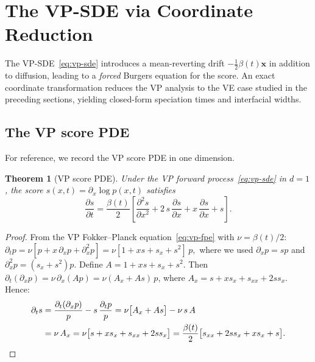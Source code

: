 \documentclass[11pt]{article}
\newtheorem{theorem}{Theorem}[section]
\begin{document}
\section{The VP-SDE via Coordinate Reduction}\label{sec:vp}

The VP-SDE~\eqref{eq:vp-sde} introduces a mean-reverting drift $-\tfrac{1}{2}\beta(t)\bm{x}$ in addition to diffusion, leading to a \emph{forced} Burgers equation for the score.
An exact coordinate transformation reduces the VP analysis to the VE case studied in the preceding sections, yielding closed-form speciation times and interfacial widths.

\subsection{The VP score PDE}\label{sec:vp:pde}

For reference, we record the VP score PDE in one dimension.

\begin{theorem}[VP score PDE]\label{thm:vp-score-pde}
Under the VP forward process~\eqref{eq:vp-sde} in $d=1$, the score $s(x,t) = \partial_x \log p(x,t)$ satisfies
\begin{equation}\label{eq:vp-score-pde}
  \frac{\partial s}{\partial t}
  = \frac{\beta(t)}{2}\!\left[
      \frac{\partial^2 s}{\partial x^2}
    + 2\,s\,\frac{\partial s}{\partial x}
    + x\,\frac{\partial s}{\partial x}
    + s
  \right].
\end{equation}
\end{theorem}

\begin{proof}
From the VP Fokker--Planck equation~\eqref{eq:vp-fpe} with $\nu = \beta(t)/2$:
$\partial_t p = \nu[p + x\,\partial_x p + \partial_x^2 p] = \nu[1 + xs + s_x + s^2]\,p,$
where we used $\partial_x p = sp$ and $\partial_x^2 p = (s_x + s^2)p$.
Define $A = 1 + xs + s_x + s^2$.
Then $\partial_t(\partial_x p) = \nu\,\partial_x(Ap) = \nu(A_x + As)\,p$, where
$A_x = s + xs_x + s_{xx} + 2ss_x$.
Hence:
\begin{align*}
  \partial_t s
  &= \frac{\partial_t(\partial_x p)}{p} - s\,\frac{\partial_t p}{p}
   = \nu\bigl[A_x + As\bigr] - \nu\,s\,A\\
  &= \nu\,A_x
   = \nu\bigl[s + xs_x + s_{xx} + 2ss_x\bigr]
   = \frac{\beta(t)}{2}\bigl[s_{xx} + 2ss_x + xs_x + s\bigr]. \qedhere
\end{align*}
\end{proof}
\end{document}
